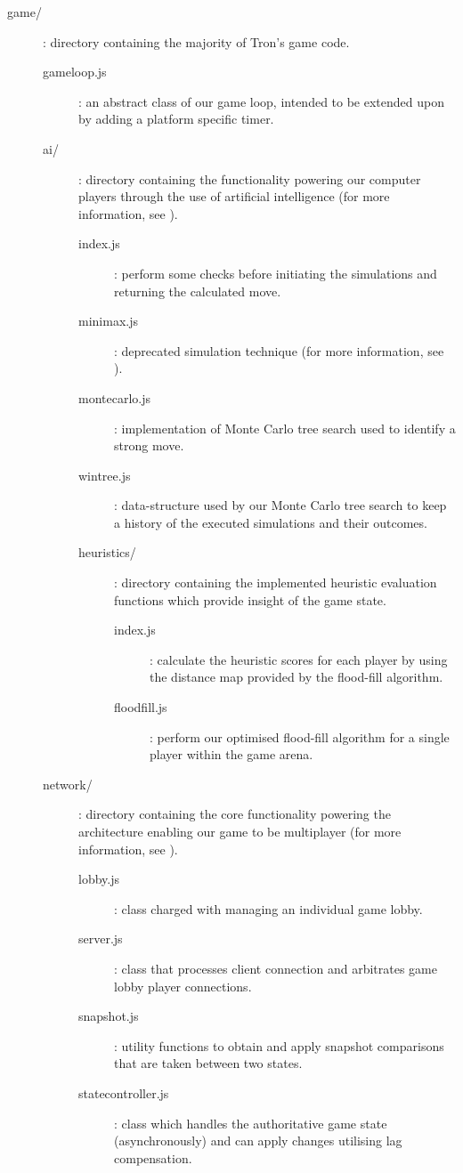 \documentclass{standalone}
\begin{document}
\begin{formal}
\begin{description}
\begin{description}
					    \item[game/]: directory containing the majority of Tron's game code.
			      	\begin{description}
			      		\item[gameloop.js]: an abstract class of our game loop, intended to be extended upon by adding a platform specific timer.

			      		\item[ai/]: directory containing the functionality powering our computer players through the use of artificial intelligence (for more information, see ).
				      	\begin{description}
				      		\item[index.js]: perform some checks before initiating the simulations and returning the calculated move.
				      		\item[minimax.js]: deprecated simulation technique (for more information, see ).
				      		\item[montecarlo.js]: implementation of Monte Carlo tree search used to identify a strong move.
				      		\item[wintree.js]: data-structure used by our Monte Carlo tree search to keep a history of the executed simulations and their outcomes.

				      		\item[heuristics/]: directory containing the implemented heuristic evaluation functions which provide insight of the game state.
					      	\begin{description}
				      			\item[index.js]: calculate the heuristic scores for each player by using the distance map provided by the flood-fill algorithm.
				      			\item[floodfill.js]: perform our optimised flood-fill algorithm for a single player within the game arena.
					      	\end{description}
						    \end{description}

						    \item[network/]: directory containing the core functionality powering the architecture enabling our game to be multiplayer (for more information, see ).
				      	\begin{description}
			      			\item[lobby.js]: class charged with managing an individual game lobby.
			      			\item[server.js]: class that processes client connection and arbitrates game lobby player connections.
			      			\item[snapshot.js]: utility functions to obtain and apply snapshot comparisons that are taken between two states.
			      			\item[statecontroller.js]: class which handles the authoritative game state (asynchronously) and can apply changes utilising lag compensation.


\end{description}
\end{description}
\end{description}
\end{description}
\end{formal}
\end{document}
